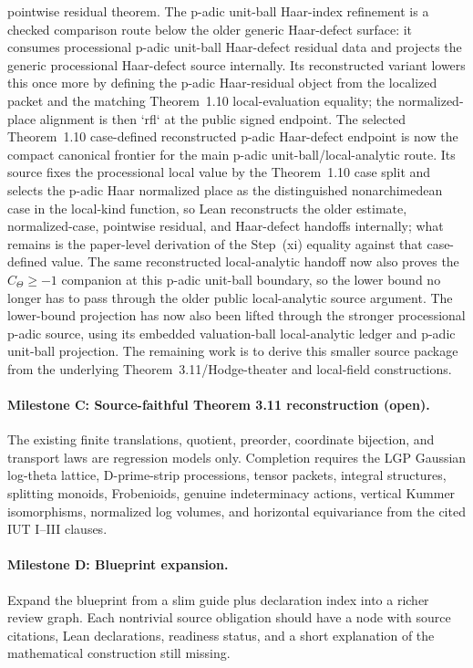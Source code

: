 \documentclass[11pt]{article}
\newcommand{\CTheta}{C_\Theta}
\theoremstyle{plain}
\theoremstyle{definition}
\theoremstyle{remark}
\begin{document}
pointwise residual theorem.  The p-adic unit-ball Haar-index refinement is a
checked comparison route below the older generic Haar-defect surface: it
consumes processional p-adic unit-ball Haar-defect residual data and projects
the generic processional Haar-defect source internally.  Its reconstructed
variant lowers this once more by defining the p-adic Haar-residual object from
the localized packet and the matching Theorem~1.10 local-evaluation equality;
the normalized-place alignment is then `rfl` at the public signed endpoint.
The selected Theorem~1.10 case-defined reconstructed p-adic Haar-defect
endpoint is now the compact canonical frontier for the main p-adic
unit-ball/local-analytic route.  Its source fixes the processional local value
by the Theorem~1.10 case split and selects the p-adic Haar normalized place as
the distinguished nonarchimedean case in the local-kind function, so Lean
reconstructs the older estimate, normalized-case, pointwise residual, and
Haar-defect handoffs internally; what remains is the paper-level derivation of
the Step~(xi) equality against that case-defined value.
The same reconstructed local-analytic handoff now also proves the
\(\CTheta\ge -1\) companion at this p-adic unit-ball boundary, so the lower
bound no longer has to pass through the older public local-analytic source
argument.  The lower-bound projection has now also been lifted through the
stronger processional p-adic source, using its embedded valuation-ball
local-analytic ledger and p-adic unit-ball projection.  The remaining work is
to derive this smaller source package from the underlying
Theorem~3.11/Hodge-theater and local-field constructions.

\paragraph{Milestone C: Source-faithful Theorem 3.11 reconstruction (open).}
The existing finite translations, quotient, preorder, coordinate bijection,
and transport laws are regression models only. Completion requires the LGP
Gaussian log-theta lattice, D-prime-strip processions, tensor packets, integral
structures, splitting monoids, Frobenioids, genuine indeterminacy actions,
vertical Kummer isomorphisms, normalized log volumes, and horizontal
equivariance from the cited IUT I--III clauses.

\paragraph{Milestone D: Blueprint expansion.}
Expand the blueprint from a slim guide plus declaration index into a richer
review graph.  Each nontrivial source obligation should have a node with source
citations, Lean declarations, readiness status, and a short explanation of the
mathematical construction still missing.
\end{document}
